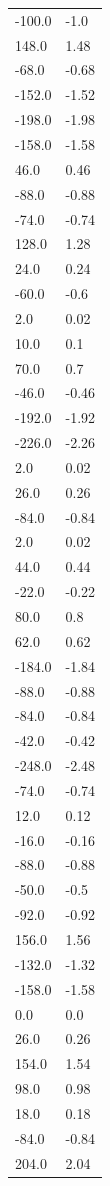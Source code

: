 \begin{longtable}{ll}
-100.0 & -1.0 \\
148.0 & 1.48 \\
-68.0 & -0.68 \\
-152.0 & -1.52 \\
-198.0 & -1.98 \\
-158.0 & -1.58 \\
46.0 & 0.46 \\
-88.0 & -0.88 \\
-74.0 & -0.74 \\
128.0 & 1.28 \\
24.0 & 0.24 \\
-60.0 & -0.6 \\
2.0 & 0.02 \\
10.0 & 0.1 \\
70.0 & 0.7 \\
-46.0 & -0.46 \\
-192.0 & -1.92 \\
-226.0 & -2.26 \\
2.0 & 0.02 \\
26.0 & 0.26 \\
-84.0 & -0.84 \\
2.0 & 0.02 \\
44.0 & 0.44 \\
-22.0 & -0.22 \\
80.0 & 0.8 \\
62.0 & 0.62 \\
-184.0 & -1.84 \\
-88.0 & -0.88 \\
-84.0 & -0.84 \\
-42.0 & -0.42 \\
-248.0 & -2.48 \\
-74.0 & -0.74 \\
12.0 & 0.12 \\
-16.0 & -0.16 \\
-88.0 & -0.88 \\
-50.0 & -0.5 \\
-92.0 & -0.92 \\
156.0 & 1.56 \\
-132.0 & -1.32 \\
-158.0 & -1.58 \\
0.0 & 0.0 \\
26.0 & 0.26 \\
154.0 & 1.54 \\
98.0 & 0.98 \\
18.0 & 0.18 \\
-84.0 & -0.84 \\
204.0 & 2.04 \\

\end{longtable}

